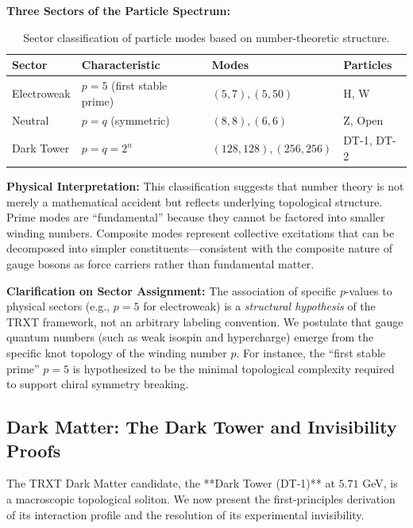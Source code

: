 \documentclass[a4paper,12pt]{article}
\begin{document}
\textbf{Three Sectors of the Particle Spectrum:}

\begin{table}[H]
\centering
\small
\begin{tabular}{llll}
\toprule
\textbf{Sector} & \textbf{Characteristic} & \textbf{Modes} & \textbf{Particles} \\
\midrule
Electroweak & $p = 5$ (first stable prime) & $(5, 7), (5, 50)$ & H, W \\
Neutral & $p = q$ (symmetric) & $(8, 8), (6, 6)$ & Z, Open \\
Dark Tower & $p = q = 2^n$ & $(128, 128), (256, 256)$ & DT-1, DT-2 \\
\bottomrule
\end{tabular}
\caption{Sector classification of particle modes based on number-theoretic structure.}
\label{tab:sectors}
\end{table}

\textbf{Physical Interpretation:}
This classification suggests that number theory is not merely a mathematical accident but reflects underlying topological structure. Prime modes are ``fundamental'' because they cannot be factored into smaller winding numbers. Composite modes represent collective excitations that can be decomposed into simpler constituents---consistent with the composite nature of gauge bosons as force carriers rather than fundamental matter.

\textbf{Clarification on Sector Assignment:}
The association of specific $p$-values to physical sectors (e.g., $p=5$ for electroweak) is a \emph{structural hypothesis} of the TRXT framework, not an arbitrary labeling convention. We postulate that gauge quantum numbers (such as weak isospin and hypercharge) emerge from the specific knot topology of the winding number $p$. For instance, the ``first stable prime'' $p=5$ is hypothesized to be the minimal topological complexity required to support chiral symmetry breaking.


\subsection{Dark Matter: The Dark Tower and Invisibility Proofs}
\label{sec:dark_matter_v12}

The TRXT Dark Matter candidate, the **Dark Tower (DT-1)** at $5.71$ GeV, is a macroscopic topological soliton. We now present the first-principles derivation of its interaction profile and the resolution of its experimental invisibility.
\end{document}

